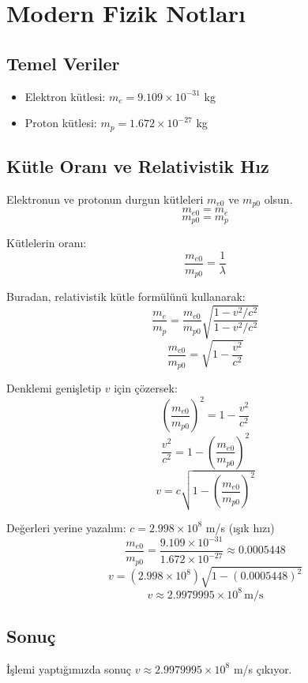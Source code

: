 \documentclass{article}
\begin{document}
\section{Modern Fizik Notları}

\subsection{Temel Veriler}
\begin{itemize}
    \item Elektron kütlesi: \( m_e = 9.109 \times 10^{-31} \) kg
    \item Proton kütlesi: \( m_p = 1.672 \times 10^{-27} \) kg
\end{itemize}

\subsection{Kütle Oranı ve Relativistik Hız}
Elektronun ve protonun durgun kütleleri \( m_{e0} \) ve \( m_{p0} \) olsun.
\[ m_{e0} = m_e \]
\[ m_{p0} = m_p \]

Kütlelerin oranı:
\[ \frac{m_{e0}}{m_{p0}} = \frac{1}{\lambda} \]

Buradan, relativistik kütle formülünü kullanarak:
\[ \frac{m_e}{m_p} = \frac{m_{e0}}{m_{p0}} \sqrt{\frac{1 - v^2/c^2}{1 - v^2/c^2}} \]
\[ \frac{m_{e0}}{m_{p0}} = \sqrt{1 - \frac{v^2}{c^2}} \]

Denklemi genişletip \( v \) için çözersek:
\[ \left( \frac{m_{e0}}{m_{p0}} \right)^2 = 1 - \frac{v^2}{c^2} \]
\[ \frac{v^2}{c^2} = 1 - \left( \frac{m_{e0}}{m_{p0}} \right)^2 \]
\[ v = c \sqrt{1 - \left( \frac{m_{e0}}{m_{p0}} \right)^2} \]

Değerleri yerine yazalım:
\( c = 2.998 \times 10^8 \) m/s (ışık hızı)
\[ \frac{m_{e0}}{m_{p0}} = \frac{9.109 \times 10^{-31}}{1.672 \times 10^{-27}} \approx 0.0005448 \]
\[ v = (2.998 \times 10^8) \sqrt{1 - (0.0005448)^2} \]
\[ v \approx 2.9979995 \times 10^8 \, \text{m/s} \]

\subsection{Sonuç}
İşlemi yaptığımızda sonuç \( v \approx 2.9979995 \times 10^8 \) m/s çıkıyor.
\end{document}
